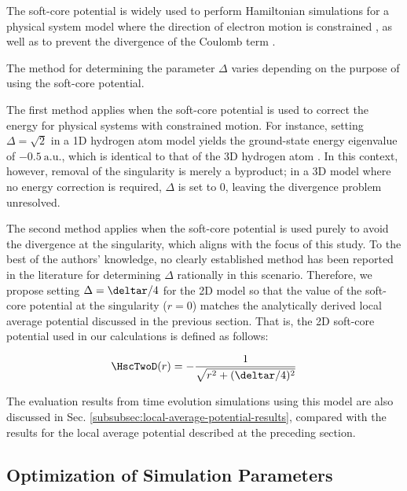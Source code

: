 \documentclass[manuscript_main.tex]{subfiles}
\begin{document}
The soft-core potential is widely used to perform Hamiltonian simulations for a
physical system model where the direction of electron motion is constrained
\cite{Hall2009.PhysRevA.80.032507, Fernandez_1991,
LiChen2021.doi:10.1021/acs.jpca.1c00698}, as well as to prevent the divergence
of the Coulomb term \cite{Childs2022quantumsimulationof}.

The method for determining the parameter $\Delta$ varies depending on the
purpose of using the soft-core potential.

The first method applies when the soft-core potential is used to correct the
energy for physical systems with constrained motion. For instance, setting
$\Delta=\sqrt{2}$ in a 1D hydrogen atom model yields the ground-state energy
eigenvalue of $-0.5\ \mathrm{a.u.}$, which is identical to that of the 3D
hydrogen atom \cite{Eberly1991.PhysRevA.44.5997}. In this context, however,
removal of the singularity is merely a byproduct; in a 3D model where no energy
correction is required, $\Delta$ is set to $0$, leaving the divergence problem
unresolved.

The second method applies when the soft-core potential is used purely to avoid
the divergence at the singularity, which aligns with the focus of this study. To
the best of the authors' knowledge, no clearly established method has been
reported in the literature for determining $\Delta$ rationally in this scenario.
Therefore, we propose setting $\Delta = \deltar/4$ for the 2D model so that the
value of the soft-core potential at the singularity ($r=0$) matches the
analytically derived local average potential discussed in the previous section.
That is, the 2D soft-core potential used in our calculations is defined as
follows:

\begin{equation}
\HscTwoD(r) = - \frac{1}{\sqrt{r^2+(\deltar/4)^2}}
\label{eq:Hsc2r-fixed}
\end{equation}

The evaluation results from time evolution simulations using this model are also
discussed in Sec. \ref{subsubsec:local-average-potential-results}, compared with
the results for the local average potential described at the preceding section.

\subsection{Optimization of Simulation Parameters}
\label{subsec:optimization-of-simulation-parameters}
\end{document}
